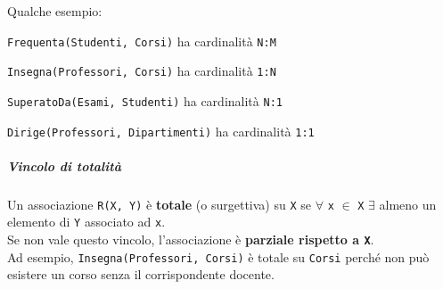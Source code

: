 \documentclass[10pt]{book}
\begin{document}
Qualche esempio:
\begin{list}{}{}
	\item \texttt{Frequenta(Studenti, Corsi)} ha cardinalità \texttt{N:M}
	\item \texttt{Insegna(Professori, Corsi)} ha cardinalità \texttt{1:N}
	\item \texttt{SuperatoDa(Esami, Studenti)} ha cardinalità \texttt{N:1}
	\item \texttt{Dirige(Professori, Dipartimenti)} ha cardinalità \texttt{1:1}
\end{list}
\subparagraph{Vincolo di totalità} Un associazione \texttt{R(X, Y)} è \textbf{totale} (o surgettiva) su \texttt{X} se $\forall$ \texttt{x} $\in$ \texttt{X} $\exists$ almeno un elemento di \texttt{Y} associato ad \texttt{x}.\\
Se non vale questo vincolo, l'associazione è \textbf{parziale rispetto a \texttt{X}}.\\
Ad esempio, \texttt{Insegna(Professori, Corsi)} è totale su \texttt{Corsi} perché non può esistere un corso senza il corrispondente docente.
\end{document}
